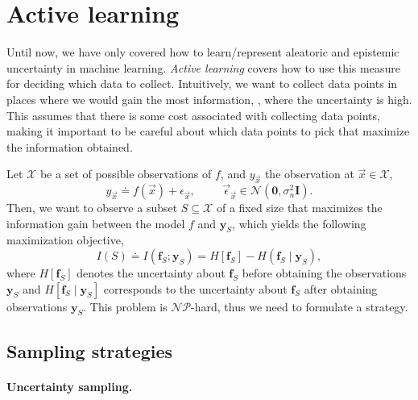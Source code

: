 \section{Active learning} \label{sec:active_learning}

Until now, we have only covered how to learn/represent aleatoric and epistemic
uncertainty in machine learning. \textit{Active learning} covers how to use
this measure for deciding which data to collect. Intuitively, we want to
collect data points in places where we would gain the most information, \ie,
where the uncertainty is high. This assumes that there is some cost associated
with collecting data points, making it important to be careful about which data
points to pick that maximize the information obtained.

Let $\mathcal{X}$ be a set of possible observations of $f$, and $y_{\vec{x}}$
the observation at $\vec{x}\in\mathcal{X}$, \[
  y_{\vec{x}} \doteq f(\vec{x}) + \epsilon_{\vec{x}}, \hspace{1cm} \vec{\epsilon}_{\vec{x}} \in \mathcal{N}(\bm{0},\sigma_n^2 \bm{I})
.\]
Then, we want to observe a subset $S\subseteq\mathcal{X}$ of a fixed size
that maximizes the information gain between the model $f$ and $\bm{y}_S$,
which yields the following maximization objective, \[
  I(S) \doteq I(\bm{f}_S;\bm{y}_S) = H[\bm{f}_S] - H(\bm{f}_S\mid\bm{y}_S)
,\]
where $H[\bm{f}_S]$ denotes the uncertainty about $\bm{f}_S$ before obtaining
the observations $\bm{y}_S$ and $H[\bm{f}_S\mid\bm{y}_S]$ corresponds to the
uncertainty about $\bm{f}_S$ after obtaining observations $\bm{y}_S$. This
problem is $\mathcal{NP}$-hard, thus we need to formulate a strategy.

\subsection{Sampling strategies}

\paragraph{Uncertainty sampling.}

